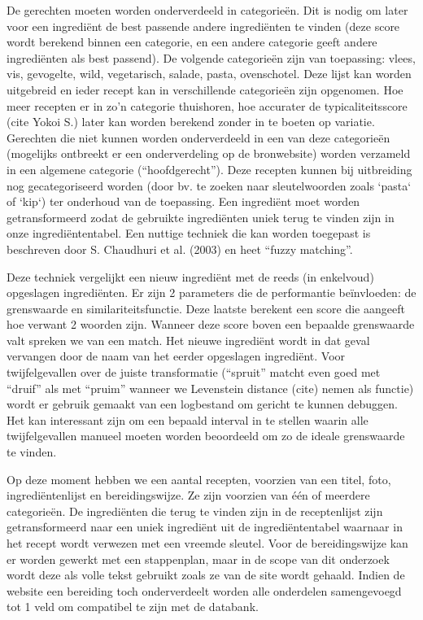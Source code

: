 \documentclass{hogent-article}
\begin{document}
De gerechten moeten worden onderverdeeld in categorieën. Dit is nodig om later voor een ingrediënt de best passende andere ingrediënten te vinden (deze score wordt berekend binnen een categorie, en een andere categorie geeft andere ingrediënten als best passend). De volgende categorieën zijn van toepassing: vlees, vis, gevogelte, wild, vegetarisch, salade, pasta, ovenschotel. Deze lijst kan worden uitgebreid en ieder recept kan in verschillende categorieën zijn opgenomen. Hoe meer recepten er in zo'n categorie thuishoren, hoe accurater de typicaliteitsscore (cite Yokoi S.) later kan worden berekend zonder in te boeten op variatie. Gerechten die niet kunnen worden onderverdeeld in een van deze categorieën (mogelijks ontbreekt er een onderverdeling op de bronwebsite) worden verzameld in een algemene categorie (“hoofdgerecht”). Deze recepten kunnen bij uitbreiding nog gecategoriseerd worden (door bv. te zoeken naar sleutelwoorden zoals `pasta` of `kip`) ter onderhoud van de toepassing.
Een ingrediënt moet worden getransformeerd zodat de gebruikte ingrediënten uniek terug te vinden zijn in onze ingrediëntentabel. Een nuttige techniek die kan worden toegepast is beschreven door S. Chaudhuri et al. (2003) en heet “fuzzy matching”.  

Deze techniek vergelijkt een nieuw ingrediënt met de reeds (in enkelvoud) opgeslagen ingrediënten. Er zijn 2 parameters die de performantie beïnvloeden: de grenswaarde en similariteitsfunctie. Deze laatste berekent een score die aangeeft hoe verwant 2 woorden zijn. Wanneer deze score boven een bepaalde grenswaarde valt spreken we van een match. Het nieuwe ingrediënt wordt in dat geval vervangen door de naam van het eerder opgeslagen ingrediënt. Voor twijfelgevallen over de juiste transformatie (“spruit” matcht even goed met “druif” als met “pruim” wanneer we Levenstein distance (cite) nemen als functie) wordt er gebruik gemaakt van een logbestand om gericht te kunnen debuggen. Het kan interessant zijn om een bepaald interval in te stellen waarin alle twijfelgevallen manueel moeten worden beoordeeld om zo de ideale grenswaarde te vinden.

Op deze moment hebben we een aantal recepten, voorzien van een titel, foto, ingrediëntenlijst en bereidingswijze. Ze zijn voorzien van één of meerdere categorieën. De ingrediënten die terug te vinden zijn in de receptenlijst zijn getransformeerd naar een uniek ingrediënt uit de ingrediëntentabel waarnaar in het recept wordt verwezen met een vreemde sleutel. Voor de bereidingswijze kan er worden gewerkt met een stappenplan, maar in de scope van dit onderzoek wordt deze als volle tekst gebruikt zoals ze van de site wordt gehaald. Indien de website een bereiding toch onderverdeelt worden alle onderdelen samengevoegd tot 1 veld om compatibel te zijn met de databank.
\end{document}
